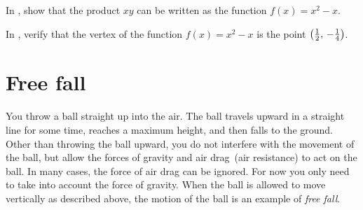 \documentclass[a4paper,oneside,12pt]{article}
\begin{document}

\begin{exercise}
In , show that the product $xy$ can be
written as the function $f(x) = x^2 - x$.
\end{exercise}


\begin{exercise}
In , verify that the vertex of the
function $f(x) = x^2 - x$ is the point
$\left\lparen{\frac{1}{2}},\, {-\frac{1}{4}}\right\rparen$.
\end{exercise}




\section{Free fall}

You throw a ball straight up into the air.  The ball travels upward in
a straight line for some time, reaches a maximum height, and then
falls to the ground.  Other than throwing the ball upward, you do not
interfere with the movement of the ball, but allow the forces of
gravity and air drag~(air resistance) to act on the ball.  In many
cases, the force of air drag can be ignored.  For now you only need to
take into account the force of gravity.  When the ball is allowed to
move vertically as described above, the motion of the ball is an
example of \emph{free fall}.
\end{document}
